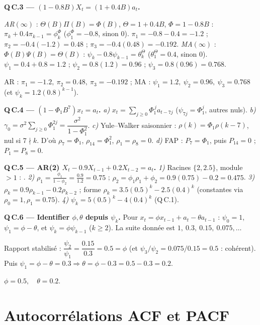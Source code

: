 \documentclass[11pt]{article}
\begin{document}
\textbf{Q\,C.3 --- $(1-0.8B)X_t=(1+0.4B)a_t$.}
\begin{etapes}
\emph{AR$(\infty)$} : $\Theta(B)\Pi(B)=\Phi(B)$, $\Theta=1+0.4B$, $\Phi=1-0.8B$ :
$\pi_k+0.4\pi_{k-1}=\phi^\Phi_k$ ($\phi^\Phi_1=-0.8$, sinon $0$).
$\pi_1=-0.8-0.4=-1.2$ ; $\pi_2=-0.4(-1.2)=0.48$ ; $\pi_3=-0.4(0.48)=-0.192$.
\emph{MA$(\infty)$} : $\Phi(B)\Psi(B)=\Theta(B)$ : $\psi_k-0.8\psi_{k-1}=\theta^\Theta_k$
($\theta^\Theta_1=0.4$, sinon $0$).
$\psi_1=0.4+0.8=1.2$ ; $\psi_2=0.8(1.2)=0.96$ ; $\psi_3=0.8(0.96)=0.768$.
\end{etapes}
\begin{reponse}AR : $\pi_1=-1.2,\ \pi_2=0.48,\ \pi_3=-0.192$ ;\quad
MA : $\psi_1=1.2,\ \psi_2=0.96,\ \psi_3=0.768$ (et $\psi_k=1.2(0.8)^{k-1}$).\end{reponse}

\textbf{Q\,C.4 --- $(1-\Phi_1B^7)x_t=a_t$.}
\emph{a)} $x_t=\sum_{j\ge0}\Phi_1^{\,j}a_{t-7j}$ ($\psi_{7j}=\Phi_1^j$, autres nuls).
\emph{b)} $\gamma_0=\sigma^2\sum_{j\ge0}\Phi_1^{2j}=\dfrac{\sigma^2}{1-\Phi_1^2}$.
\emph{c)} Yule--Walker saisonnier : $\rho(k)=\Phi_1\rho(k-7)$, nul si $7\nmid k$. D'où
$\rho_7=\Phi_1$, $\rho_{14}=\Phi_1^2$, $\rho_1=\rho_8=0$.
\emph{d)} FAP : $P_7=\Phi_1$, puis $P_{14}=0$ ; $P_1=P_8=0$.

\textbf{Q\,C.5 --- AR(2) $X_t-0.9X_{t-1}+0.2X_{t-2}=a_t$.}
\emph{1)} Racines $\{2,2.5\}$, module $>1$ : .
\emph{2)} $\rho_1=\frac{\phi_1}{1-\phi_2}=\frac{0.9}{1.2}=0.75$ ;
$\rho_2=\phi_1\rho_1+\phi_2=0.9(0.75)-0.2=0.475$.
\emph{3)} $\rho_k=0.9\rho_{k-1}-0.2\rho_{k-2}$ ; forme $\rho_k=3.5(0.5)^k-2.5(0.4)^k$
(constantes via $\rho_0=1,\rho_1=0.75$).
\emph{4)} $\psi_k=5(0.5)^k-4(0.4)^k$ (Q\,C.1).

\textbf{Q\,C.6 --- Identifier $\phi,\theta$ depuis $\psi_k$.}
Pour $x_t=\phi x_{t-1}+a_t-\theta a_{t-1}$ : $\psi_0=1$, $\psi_1=\phi-\theta$, et
$\psi_k=\phi\psi_{k-1}$ ($k\ge2$). La suite donnée est $1,\ 0.3,\ 0.15,\ 0.075,\dots$
\begin{etapes}
Rapport stabilisé : $\dfrac{\psi_2}{\psi_1}=\dfrac{0.15}{0.3}=0.5=\phi$
(et $\psi_3/\psi_2=0.075/0.15=0.5$ : cohérent).
Puis $\psi_1=\phi-\theta=0.3\Rightarrow\theta=\phi-0.3=0.5-0.3=0.2$.
\end{etapes}
\begin{reponse}$\boxed{\phi=0.5,\quad \theta=0.2}$.\end{reponse}

\section{Autocorrélations ACF et PACF}
\end{document}
